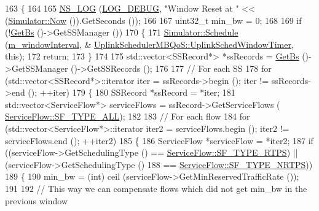 \begin{DoxyCode}
163 \{
164 
165   \hyperlink{log-macros-disabled_8h_ab01b4392d98b06fb128e77c85129a477}{NS\_LOG} (\hyperlink{namespacens3_aa6464a4d69551a9cc968e17a65f39bdbae5a9fe44e2d62303656baa0cf1a687a0}{LOG\_DEBUG}, \textcolor{stringliteral}{"Window Reset at "} << (\hyperlink{classns3_1_1Simulator_ac3178fa975b419f7875e7105be122800}{Simulator::Now} ()).GetSeconds ());
166 
167   uint32\_t min\_bw = 0;
168 
169   \textcolor{keywordflow}{if} (!\hyperlink{classns3_1_1UplinkScheduler_afe61b7de71d92d2dff1b135744a6ff7e}{GetBs} ()->GetSSManager ())
170     \{
171       \hyperlink{classns3_1_1Simulator_a671882c894a08af4a5e91181bf1eec13}{Simulator::Schedule} (\hyperlink{classns3_1_1UplinkSchedulerMBQoS_aa3fb881e781d8cda4e7bb011c30d9f5d}{m\_windowInterval}, &
      \hyperlink{classns3_1_1UplinkSchedulerMBQoS_a80733614c419c105ae666e830f1d5c1e}{UplinkSchedulerMBQoS::UplinkSchedWindowTimer}, \textcolor{keyword}{this});
172       \textcolor{keywordflow}{return};
173     \}
174 
175   std::vector<SSRecord*> *ssRecords = \hyperlink{classns3_1_1UplinkScheduler_afe61b7de71d92d2dff1b135744a6ff7e}{GetBs} ()->GetSSManager ()->GetSSRecords ();
176 
177   \textcolor{comment}{// For each SS}
178   \textcolor{keywordflow}{for} (std::vector<SSRecord*>::iterator iter = ssRecords->begin (); iter != ssRecords->end (); ++iter)
179     \{
180       SSRecord *ssRecord = *iter;
181       std::vector<ServiceFlow*> serviceFlows = ssRecord->GetServiceFlows (
      \hyperlink{classns3_1_1ServiceFlow_a7990ba10be1e098328fd1e6382a26235aaf7e58e43027cc9d351cd100a9d6dee3}{ServiceFlow::SF\_TYPE\_ALL});
182 
183       \textcolor{comment}{// For each flow}
184       \textcolor{keywordflow}{for} (std::vector<ServiceFlow*>::iterator iter2 = serviceFlows.begin (); iter2 != serviceFlows.end ();
       ++iter2)
185         \{
186           ServiceFlow *serviceFlow = *iter2;
187           \textcolor{keywordflow}{if} ((serviceFlow->GetSchedulingType () == \hyperlink{classns3_1_1ServiceFlow_a7990ba10be1e098328fd1e6382a26235a0e98ff713b932a029acad7e5b24bbf55}{ServiceFlow::SF\_TYPE\_RTPS}) || 
      (serviceFlow->GetSchedulingType ()
188                                                                                    == 
      \hyperlink{classns3_1_1ServiceFlow_a7990ba10be1e098328fd1e6382a26235a7f8577f851a9f01d159442a3a3fcdf48}{ServiceFlow::SF\_TYPE\_NRTPS}))
189             \{
190               min\_bw = (int) ceil (serviceFlow->GetMinReservedTrafficRate ());
191 
192               \textcolor{comment}{// This way we can compensate flows which did not get min\_bw in the previous window}

\end{DoxyCode}
